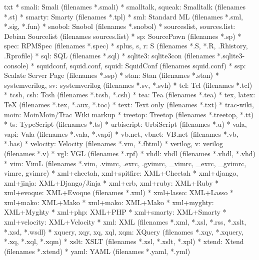 \documentclass[11pt,oneside]{book}
\begin{document}
\begin{common-format}
\begin{xverbatim}{txt}
* smali:
    Smali (filenames *.smali)
* smalltalk, squeak:
    Smalltalk (filenames *.st)
* smarty:
    Smarty (filenames *.tpl)
* sml:
    Standard ML (filenames *.sml, *.sig, *.fun)
* snobol:
    Snobol (filenames *.snobol)
* sourceslist, sources.list:
    Debian Sourcelist (filenames sources.list)
* sp:
    SourcePawn (filenames *.sp)
* spec:
    RPMSpec (filenames *.spec)
* splus, s, r:
    S (filenames *.S, *.R, .Rhistory, .Rprofile)
* sql:
    SQL (filenames *.sql)
* sqlite3:
    sqlite3con (filenames *.sqlite3-console)
* squidconf, squid.conf, squid:
    SquidConf (filenames squid.conf)
* ssp:
    Scalate Server Page (filenames *.ssp)
* stan:
    Stan (filenames *.stan)
* systemverilog, sv:
    systemverilog (filenames *.sv, *.svh)
* tcl:
    Tcl (filenames *.tcl)
* tcsh, csh:
    Tcsh (filenames *.tcsh, *.csh)
* tea:
    Tea (filenames *.tea)
* tex, latex:
    TeX (filenames *.tex, *.aux, *.toc)
* text:
    Text only (filenames *.txt)
* trac-wiki, moin:
    MoinMoin/Trac Wiki markup 
* treetop:
    Treetop (filenames *.treetop, *.tt)
* ts:
    TypeScript (filenames *.ts)
* urbiscript:
    UrbiScript (filenames *.u)
* vala, vapi:
    Vala (filenames *.vala, *.vapi)
* vb.net, vbnet:
    VB.net (filenames *.vb, *.bas)
* velocity:
    Velocity (filenames *.vm, *.fhtml)
* verilog, v:
    verilog (filenames *.v)
* vgl:
    VGL (filenames *.rpf)
* vhdl:
    vhdl (filenames *.vhdl, *.vhd)
* vim:
    VimL (filenames *.vim, .vimrc, .exrc, .gvimrc, _vimrc, _exrc, _gvimrc, vimrc, gvimrc)
* xml+cheetah, xml+spitfire:
    XML+Cheetah 
* xml+django, xml+jinja:
    XML+Django/Jinja 
* xml+erb, xml+ruby:
    XML+Ruby 
* xml+evoque:
    XML+Evoque (filenames *.xml)
* xml+lasso:
    XML+Lasso 
* xml+mako:
    XML+Mako 
* xml+mako:
    XML+Mako 
* xml+myghty:
    XML+Myghty 
* xml+php:
    XML+PHP 
* xml+smarty:
    XML+Smarty 
* xml+velocity:
    XML+Velocity 
* xml:
    XML (filenames *.xml, *.xsl, *.rss, *.xslt, *.xsd, *.wsdl)
* xquery, xqy, xq, xql, xqm:
    XQuery (filenames *.xqy, *.xquery, *.xq, *.xql, *.xqm)
* xslt:
    XSLT (filenames *.xsl, *.xslt, *.xpl)
* xtend:
    Xtend (filenames *.xtend)
* yaml:
    YAML (filenames *.yaml, *.yml)


\end{xverbatim}
\end{common-format}
\end{document}
